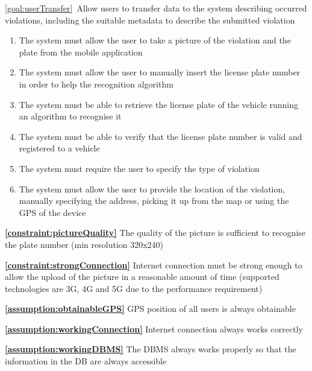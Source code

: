 \begin{description}
		\item \ref{goal:userTransfer}\ Allow users to transfer data to the system describing occurred violations, including the suitable metadata to describe the submitted violation			
			 \begin{enumerate}[resume*]
				\item The system must allow the user to take a picture of the violation and the plate from the mobile application
  				\item The system must allow the user to manually insert the license plate number in order to help the recognition algorithm
  				\item The system must be able to retrieve the license plate of the vehicle running an algorithm to recognise it
  				\item The system must be able to verify that the license plate number is valid and registered to a vehicle
  				\item The system must require the user to specify the type of violation
  				\item The system must allow the user to provide the location of the violation, manually specifying the address, picking it up from the map or using the GPS of the device
   			\end{enumerate}
   			
   			\textbf{\ref{constraint:pictureQuality}} The quality of the picture is sufficient to recognise the plate number (min resolution 320x240)
   			
			\textbf{\ref{constraint:strongConnection}} Internet connection must be strong enough to allow the upload of the picture in a reasonable amount of time (supported technologies are 3G, 4G and 5G due to the performance requirement)
			
			\textbf{\ref{assumption:obtainableGPS}} GPS position of all users is always obtainable
			
			\textbf{\ref{assumption:workingConnection}} Internet connection always works correctly
			
			\textbf{\ref{assumption:workingDBMS}} The DBMS always works properly so that the information in the DB are always accessible \newline
			

\end{description}

